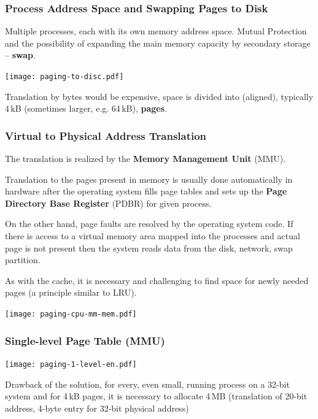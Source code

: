 \documentclass{beamer}
\begin{document}
\begin{frame}
\frametitle{Process Address Space and Swapping Pages to Disk}

Multiple processes, each with its own memory address space. Mutual Protection
and the possibility of expanding the main memory capacity by secondary storage -- \textbf{swap}.

{
\centering

\texttt{[image: paging-to-disc.pdf]}

}

Translation by bytes would be expensive, space is divided into
(aligned), typically 4\,kB (sometimes larger, e.g. 64\,kB), \textbf{pages}.

\end{frame}

\begin{frame}[shrink=1]
\frametitle{Virtual to Physical Address Translation}

The translation is realized by the \textbf{Memory Management Unit} (MMU).

Translation to the pages present in memory is usually done automatically in hardware after
the operating system fills page tables and sets up the \textbf{Page Directory Base Register}
(PDBR) for given process.

On the other hand, page faults are resolved by the operating system code.
If there is access to a virtual memory area mapped into the processes and actual page is not present then the system reads data from the disk, network, swap partition.

As with the cache, it is necessary and challenging to find space for newly needed pages (a principle similar to LRU).

\vskip 2mm

{
\centering

\texttt{[image: paging-cpu-mm-mem.pdf]}

}
\end{frame}

\begin{frame}
\frametitle{Single-level Page Table (MMU)}

{
\centering

\texttt{[image: paging-1-level-en.pdf]}

}

Drawback of the solution, for every, even small, running process on a 32-bit
system and for 4\,kB pages, it is necessary to allocate 4\,MB (translation of 20-bit address,
4-byte entry for 32-bit physical address)

\end{frame}
\end{document}
